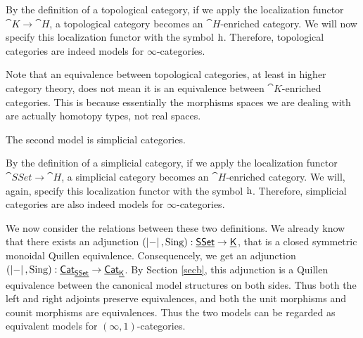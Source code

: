 By the definition of a topological category, if we apply the localization functor $\cat K\to\cat H$, a topological category becomes an
$\cat{H}$-enriched category. We will now specify this localization functor with the symbol $\mathrm{h}$. Therefore, topological categories are indeed
models for $\infty$-categories. 


Note that an equivalence between topological categories, at least in higher category theory, does not mean it is an equivalence
between $\cat K$-enriched categories. This is because essentially the morphisms spaces we are dealing with are actually homotopy types,
not real spaces.

The second model is simplicial categories.


By the definition of a simplicial category, if we apply the localization functor $\cat{SSet}\to\cat H$, a simplicial category becomes an
$\cat{H}$-enriched category. We will, again, specify this localization functor with the symbol $\mathrm{h}$. Therefore, simplicial categories
are also indeed models for $\infty$-categories. 


We now consider the relations between these two definitions. We already know that there exists an adjunction $(\left|-\right|,\operatorname{Sing}):\underline{\smash{\mathsf{SSet}}}\to\underline{\smash{\mathsf{K}}}$,
that is a closed symmetric monoidal Quillen equivalence. Consequencely, we get an adjunction 
$(\left|-\right|,\operatorname{Sing}):\underline{\smash{\mathsf{Cat}}}_{\underline{\smash{\mathsf{SSet}}}}\to\underline{\smash{\mathsf{Cat}}}_{\underline{\smash{\mathsf{K}}}}$. By Section \ref{secb}, this adjunction is a Quillen equivalence between the
canonical model structures on both sides. Thus both the left and right adjoints preserve equivalences, and both the unit morphisms 
and counit morphisms are equivalences. Thus the two models can be regarded as equivalent models for $(\infty,1)$-categories.

